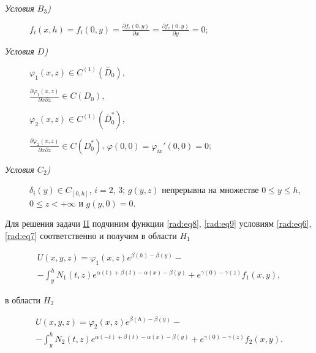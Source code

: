 \begin{description}

\item[\sl Условия $B_3$\rm)]  \hypertarget{rad:B3}{} 

$\displaystyle f_i(x,h)=f_i(0, y)=\frac{\partial f_i(0,y)}{\partial x} = \frac{\partial f_i(0,y)}{\partial y} = 0;$



\item[\sl Условия $D$\rm)]  \hypertarget{rad:D}{} 

$\varphi_1(x,z)\in C^{(1)}(\bar D_0)$, 

$\displaystyle \frac{\partial \varphi_1(x,z)}{\partial x \partial z}\in C(D_0)$, 

$\displaystyle \varphi_2(x,z)\in C^{(1)}(\bar D_0^*)$, \newline 

$\displaystyle \frac{\partial \varphi_2(x,z)}{\partial x \partial z}\in C(D_0^*)$, $\varphi(0, 0)=\varphi_{ix}'(0, 0)=0$; 



\item[\sl Условия $C_2$\rm)]  \hypertarget{rad:C2}{} 

$\delta_i(y)\in C_{[0,h]}$, $i=2,\,3$; $g(y,z)$ непрерывна на множестве \mbox{$0\leq y\leq h$,} $0\leq z< +\infty$ и $g(y , 0)=0$.



\end{description}



Для решения задачи  \hyperlink{rad:task:II}{II} подчиним функции  \eqref{rad:eq8}, \eqref{rad:eq9} условиям  \eqref{rad:eq6}, \eqref{rad:eq7} соответственно и получим в области $H_1$

\begin{multline}\label{rad:eq15}

U(x,y,z) = \varphi_1(x,z) e^{\beta(h)-\beta(y)} -  \\ - \int _y^h N_1(t,z) e^{\alpha(t)+\beta(t)-\alpha(x)-\beta(y)}+ e^{\gamma(0)-\gamma(z)}f_1(x,y),

\end{multline}

в области $H_2$

\begin{multline}\label{rad:eq16}

U(x,y,z) = \varphi_2(x,z) e^{\beta(h)-\beta(y)} - \\ -  \int _y^h N_2(t,z) e^{\alpha(-t)+\beta(t)-\alpha(x)-\beta(y)}+ e^{\gamma(0)-\gamma(z)}f_2(x,y).

\end{multline}



